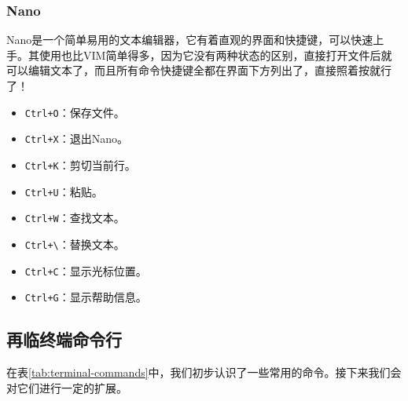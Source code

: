 \documentclass[../main.tex]{subfiles}
\begin{document}
\subsubsection{Nano}

Nano是一个简单易用的文本编辑器，它有着直观的界面和快捷键，可以快速上手。其使用也比VIM简单得多，因为它没有两种状态的区别，直接打开文件后就可以编辑文本了，而且所有命令快捷键全都在界面下方列出了，直接照着按就行了！

\begin{multicols}{2}
  \begin{itemize}
    \item \texttt{Ctrl+O}：保存文件。
    \item \texttt{Ctrl+X}：退出Nano。
    \item \texttt{Ctrl+K}：剪切当前行。
    \item \texttt{Ctrl+U}：粘贴。
    \item \texttt{Ctrl+W}：查找文本。
    \item \texttt{Ctrl+\textbackslash}：替换文本。
    \item \texttt{Ctrl+C}：显示光标位置。
    \item \texttt{Ctrl+G}：显示帮助信息。
  \end{itemize}
\end{multicols}

\subsection{再临终端命令行}

在表\ref{tab:terminal-commands}中，我们初步认识了一些常用的命令。接下来我们会对它们进行一定的扩展。
\end{document}
